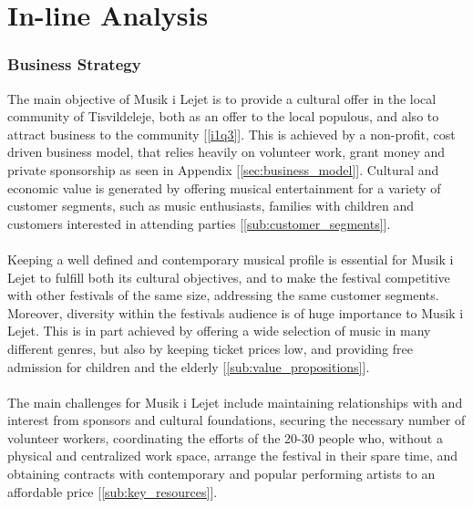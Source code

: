 \part{In-line Analysis}

\section{Business Strategy}
The main objective of Musik i Lejet is to provide a cultural offer in the local community of Tisvildeleje, both as an offer to the local populous, and also to attract business to the community [\ref{i1q3}]. This is achieved by a non-profit, cost driven business model, that relies heavily on volunteer work, grant money and private sponsorship as seen in Appendix [\ref{sec:business_model}]. Cultural and economic value is generated by offering musical entertainment for a variety of customer segments, such as music enthusiasts, families with children and customers interested in attending parties [\ref{sub:customer_segments}].
\\ \\
Keeping a well defined and contemporary musical profile is essential for Musik i Lejet to fulfill both its cultural objectives, and to make the festival competitive with other festivals of the same size, addressing the same customer segments. Moreover, diversity within the festivals audience is of huge importance to Musik i Lejet. This is in part achieved by offering a wide selection of music in many different genres, but also by keeping ticket prices low, and providing free admission for children and the elderly [\ref{sub:value_propositions}].
\\ \\
The main challenges for Musik i Lejet include maintaining relationships with and interest from sponsors and cultural foundations, securing the necessary number of volunteer workers, coordinating the efforts of the 20-30 people who, without a physical and centralized work space, arrange the festival in their spare time, and obtaining contracts with contemporary and popular performing artists to an affordable price [\ref{sub:key_resources}].

